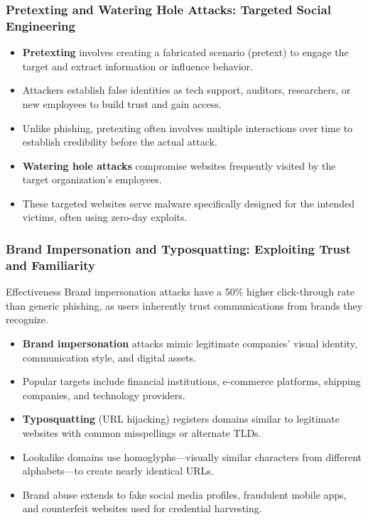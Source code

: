 \documentclass{beamer}
\begin{document}
\begin{frame}
    \frametitle{Pretexting and Watering Hole Attacks: Targeted Social Engineering}
    
    \begin{itemize}
        \item \textbf{Pretexting} involves creating a fabricated scenario (pretext) to engage the target and extract information or influence behavior.
        \item Attackers establish false identities as tech support, auditors, researchers, or new employees to build trust and gain access.
        \item Unlike phishing, pretexting often involves multiple interactions over time to establish credibility before the actual attack.
        \item \textbf{Watering hole attacks} compromise websites frequently visited by the target organization's employees.
        \item These targeted websites serve malware specifically designed for the intended victims, often using zero-day exploits.
    \end{itemize}
\end{frame}

\begin{frame}
    \frametitle{Brand Impersonation and Typosquatting: Exploiting Trust and Familiarity}
    
    \begin{alertblock}{Effectiveness}
        Brand impersonation attacks have a 50\% higher click-through rate than generic phishing, as users inherently trust communications from brands they recognize.
    \end{alertblock}
    
    \begin{itemize}
        \item \textbf{Brand impersonation} attacks mimic legitimate companies' visual identity, communication style, and digital assets.
        \item Popular targets include financial institutions, e-commerce platforms, shipping companies, and technology providers.
        \item \textbf{Typosquatting} (URL hijacking) registers domains similar to legitimate websites with common misspellings or alternate TLDs.
        \item Lookalike domains use homoglyphs—visually similar characters from different alphabets—to create nearly identical URLs.
        \item Brand abuse extends to fake social media profiles, fraudulent mobile apps, and counterfeit websites used for credential harvesting.
    \end{itemize}
\end{frame}
\end{document}
